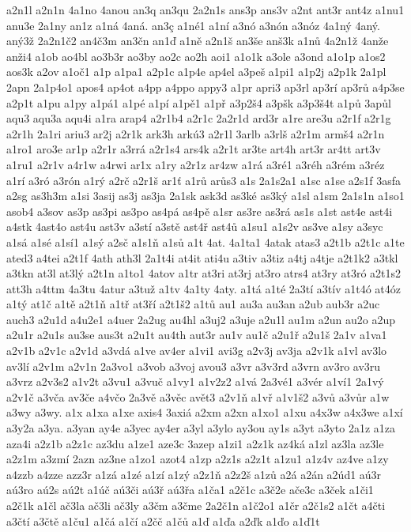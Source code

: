 {a2n1l
a2n1n
4a1no
4anou
an3q
an3qu
2a2n1s
ans3p
ans3v
a2nt
ant3r
ant4z
a1nu1
anu3e
2a1ny
an1z
a1ná
4aná.
an3ç
a1né1
a1ní
a3nó
a3nón
a3nóz
4a1ný
4aný.
aný3ž
2a2n1č2
an4č3m
an3čn
an1ď
a1ně
a2n1š
an3še
anš3k
a1nů
4a2n1ž
4anže
anži4
a1ob
ao4bl
ao3b3r
ao3by
ao2c
ao2h
aoi1
a1o1k
a3ole
a3ond
a1o1p
a1os2
aos3k
a2ov
a1oč1
a1p
a1pa1
a2p1c
a1p4e
ap4el
a3peš
a1pi1
a1p2j
a2p1k
2a1pl
2apn
2a1p4o1
apos4
ap4ot
a4pp
a4ppo
appy3
a1pr
apri3
ap3rl
ap3rí
ap3rů
a4p3se
a2p1t
a1pu
a1py
a1pá1
a1pé
a1pí
a1pě1
a1př
a3p2š4
a3pšk
a3p3š4t
a1pů
3apůl
aqu3
aqu3a
aqu4i
a1ra
arap4
a2r1b4
a2r1c
2a2r1d
ard3r
a1re
are3u
a2r1f
a2r1g
a2r1h
2a1ri
ariu3
ar2j
a2r1k
ark3h
arkú3
a2r1l
3arlb
a3rlš
a2r1m
armš4
a2r1n
a1ro1
aro3e
ar1p
a2r1r
a3rrá
a2r1s4
ars4k
a2r1t
ar3te
art4h
art3r
ar4tt
art3v
a1ru1
a2r1v
a4r1w
a4rwi
ar1x
a1ry
a2r1z
ar4zw
a1rá
a3ré1
a3réh
a3rém
a3réz
a1rí
a3ró
a3rón
a1rý
a2rč
a2r1š
ar1ť
a1rů
arůs3
a1s
2a1s2a1
a1sc
a1se
a2s1f
3asfa
a2sg
as3h3m
a1si
3asij
as3j
as3ja
2a1sk
ask3d
as3ké
as3ký
a1sl
a1sm
2a1s1n
a1so1
asob4
a3sov
as3p
as3pi
as3po
as4pá
as4pě
a1sr
as3re
as3rá
as1s
a1st
ast4e
ast4i
a4stk
4ast4o
ast4u
ast3v
a3stí
a3stě
ast4ř
ast4ů
a1su1
a1s2v
as3ve
a1sy
a3syc
a1sá
a1sé
a1sí1
a1sý
a2sč
a1s1ň
a1sů
a1t
4at.
4a1ta1
4atak
atas3
a2t1b
a2t1c
a1te
ated3
a4tei
a2t1f
4ath
ath3l
2a1t4i
at4it
ati4u
a3tiv
a3tiz
a4tj
a4tje
a2t1k2
a3tkl
a3tkn
at3l
at3lý
a2t1n
a1to1
4atov
a1tr
at3ri
at3rj
at3ro
atrs4
at3ry
at3ró
a2t1s2
att3h
a4ttm
4a3tu
4atur
a3tuž
a1tv
4a1ty
4aty.
a1tá
a1té
2a3tí
a3tív
a1t4ó
at4óz
a1tý
at1č
a1tě
a2t1ň
a1tř
at3ří
a2t1š2
a1tů
au1
au3a
au3an
a2ub
aub3r
a2uc
auch3
a2u1d
a4u2e1
a4uer
2a2ug
au4hl
a3uj2
a3uje
a2u1l
au1m
a2un
au2o
a2up
a2u1r
a2u1s
au3se
aus3t
a2u1t
au4th
aut3r
au1v
au1č
a2u1ř
a2u1š
2a1v
a1va1
a2v1b
a2v1c
a2v1d
a3vdá
a1ve
av4er
a1vi1
avi3g
a2v3j
av3ja
a2v1k
a1vl
av3lo
av3lí
a2v1m
a2v1n
2a3vo1
a3vob
a3voj
avou3
a3vr
a3v3rd
a3vrn
av3ro
av3ru
a3vrz
a2v3s2
a1v2t
a3vu1
a3vuč
a1vy1
a1v2z2
a1vá
2a3vé1
a3vér
a1ví1
2a1vý
a2v1č
a3vča
av3če
a4včo
2a3vě
a3věc
avět3
a2v1ň
a1vř
a1v1š2
a3vů
a3vůr
a1w
a3wy
a3wy.
a1x
a1xa
a1xe
axis4
3axiá
a2xm
a2xn
a1xo1
a1xu
a4x3w
a4x3we
a1xí
a3y2a
a3ya.
a3yan
ay4e
a3yec
ay4er
a3yl
a3ylo
ay3ou
ay1s
a3yt
a3yto
2a1z
a1za
aza4i
a2z1b
a2z1c
az3du
a1ze1
aze3c
3azep
a1zi1
a2z1k
az4ká
a1zl
az3la
az3le
a2z1m
a3zmí
2azn
az3ne
a1zo1
azot4
a1zp
a2z1s
a2z1t
a1zu1
a1z4v
az4ve
a1zy
a4zzb
a4zze
azz3r
a1zá
a1zé
a1zí
a1zý
a2z1ň
a2z2š
a1zů
a2á
a2án
a2úd1
aú3r
aú3ro
aú2s
aú2t
a1úč
aú3či
aú3ř
aú3řa
a1ča1
a2č1c
a3č2e
ače3c
a3ček
a1či1
a2č1k
a1čl
ač3la
ač3li
ač3ly
a3čm
a3čme
2a2č1n
a1č2o1
a1čr
a2č1s2
a1čt
a4čti
a3čtí
a3čtě
a1ču1
a1čá
a1čí
a2čč
a1čů
a1ď
a1ďa
a2ďk
a1ďo
a1ď1t
}
